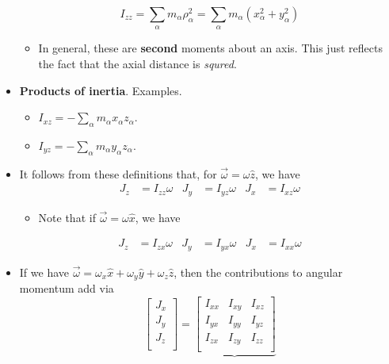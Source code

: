 \documentclass[../notes.tex]{subfiles}
\begin{document}
\begin{itemize}
    \begin{equation*}
        I_{zz} = \sum_\alpha m_\alpha\rho_\alpha^2
        = \sum_\alpha m_\alpha(x_\alpha^2+y_\alpha^2)
    \end{equation*}
    \begin{itemize}
        \item In general, these are \textbf{second} moments about an axis. This just reflects the fact that the axial distance is \emph{squred}.
    \end{itemize}
    \item \textbf{Products of inertia}. Examples.
    \begin{itemize}
        \item $I_{xz}=-\sum_\alpha m_\alpha x_\alpha z_\alpha$.
        \item $I_{yz}=-\sum_\alpha m_\alpha y_\alpha z_\alpha$.
    \end{itemize}
    \item It follows from these definitions that, for $\vec{\omega}=\omega\hat{z}$, we have
    \begin{align*}
        J_z &= I_{zz}\omega&
        J_y &= I_{yz}\omega&
        J_x &= I_{xz}\omega
    \end{align*}
    \begin{itemize}
        \item Note that if $\vec{\omega}=\omega\hat{x}$, we have
    \end{itemize}
    \begin{align*}
        J_z &= I_{zx}\omega&
        J_y &= I_{yx}\omega&
        J_x &= I_{xx}\omega
    \end{align*}
    \item If we have $\vec{\omega}=\omega_x\hat{x}+\omega_y\hat{y}+\omega_z\hat{z}$, then the contributions to angular momentum add via
    \begin{equation*}
        \begin{bmatrix}
            J_x\\
            J_y\\
            J_z\\
        \end{bmatrix}
        = \underbrace{
            \begin{bmatrix}
                I_{xx} & I_{xy} & I_{xz}\\
                I_{yx} & I_{yy} & I_{yz}\\
                I_{zx} & I_{zy} & I_{zz}\\
            \end{bmatrix}
}
\end{equation*}
\end{itemize}
\end{document}
